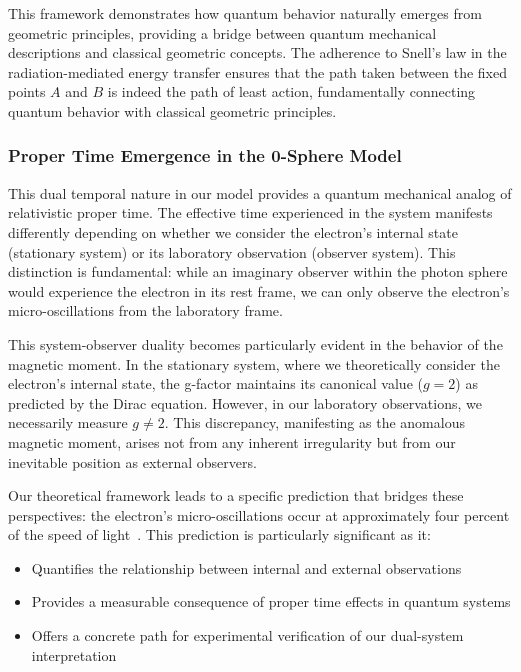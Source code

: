 \documentclass[%
 reprint,
 amsmath,amssymb,
 aps,
]{revtex4-1}
\numberwithin{equation}{section}%
\begin{document}
This framework demonstrates how quantum behavior naturally emerges from geometric principles, providing a bridge between quantum mechanical descriptions and classical geometric concepts. The adherence to Snell's law in the radiation-mediated energy transfer ensures that the path taken between the fixed points $A$ and $B$ is indeed the path of least action, fundamentally connecting quantum behavior with classical geometric principles.


\subsubsection{\label{sec:Proper Time Emergence}Proper Time Emergence in the 0-Sphere Model}

This dual temporal nature in our model provides a quantum mechanical analog of relativistic proper time. The effective time experienced in the system manifests differently depending on whether we consider the electron's internal state (stationary system) or its laboratory observation (observer system). This distinction is fundamental: while an imaginary observer within the photon sphere would experience the electron in its rest frame, we can only observe the electron's micro-oscillations from the laboratory frame.

This system-observer duality becomes particularly evident in the behavior of the magnetic moment. In the stationary system, where we theoretically consider the electron's internal state, the g-factor maintains its canonical value ($g = 2$) as predicted by the Dirac equation. However, in our laboratory observations, we necessarily measure $g \neq 2$. This discrepancy, manifesting as the anomalous magnetic moment, arises not from any inherent irregularity but from our inevitable position as external observers. 

Our theoretical framework leads to a specific prediction that bridges these perspectives: the electron's micro-oscillations occur at approximately four percent of the speed of light~\cite{hanamura2023}. This prediction is particularly significant as it:

\begin{itemize}
    \item Quantifies the relationship between internal and external observations
    \item Provides a measurable consequence of proper time effects in quantum systems
    \item Offers a concrete path for experimental verification of our dual-system interpretation
\end{itemize}
\end{document}
